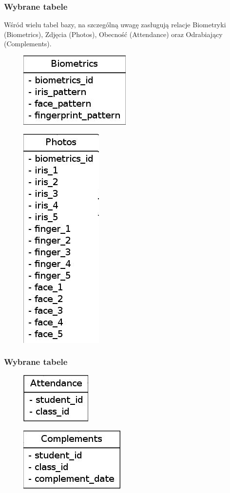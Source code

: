 \documentclass{beamer}
\begin{document}
\begin{frame}
\frametitle{Wybrane tabele}

Wśród wielu tabel bazy, na szczególną uwagę zasługują relacje Biometryki (Biometrics), Zdjęcia (Photos), Obecność (Attendance) oraz Odrabiający (Complements).
\begin{figure}
\includegraphics{biometrics.jpg}
\end{figure}
\begin{figure}
\includegraphics{photos.jpg}
\end{figure}
\end{frame}

\begin{frame}
\frametitle{Wybrane tabele}

\begin{figure}
\includegraphics{attendance.jpg}
\end{figure}
\begin{figure}
\includegraphics{complements.jpg}
\end{figure}
\end{frame}
\end{document}
